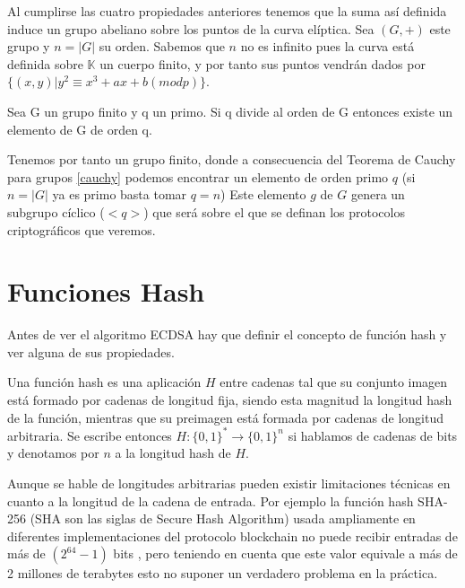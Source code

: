 Al cumplirse las cuatro propiedades anteriores tenemos que la suma así definida induce un grupo abeliano sobre los puntos de la curva elíptica. Sea $(G,+)$ este grupo y $n=|G|$ su orden. Sabemos que $n$ no es infinito pues la curva está definida sobre $\mathbb{K}$ un cuerpo finito, y por tanto sus puntos vendrán dados por $\{(x,y)| y^2 \equiv x^3 + ax + b  (mod  p) \}$. 
\theoremstyle{theorem}\begin{theorem}\label{cauchy} Sea G un grupo finito y q un primo. Si q divide al orden de G entonces existe un elemento de G de orden q.
\end{theorem}
Tenemos por tanto un grupo finito, donde a consecuencia del Teorema de Cauchy para grupos \ref{cauchy} podemos encontrar un elemento de orden primo $q$ (si $n = |G|$ ya es primo basta tomar $q = n$) Este elemento $g$ de $G$ genera un subgrupo cíclico ($<q>$) que será sobre el que se definan los protocolos criptográficos que veremos.



\section{Funciones Hash}\label{hash}
Antes de ver el algoritmo ECDSA hay que definir el concepto de función hash y ver alguna de sus propiedades.
\theoremstyle{definition}\begin{definition}\label{hash_def} Una función hash es una aplicación $\textit{H}$ entre cadenas tal que su conjunto imagen está formado por cadenas de longitud fija, siendo esta magnitud la longitud hash de la función, mientras que su preimagen está formada por cadenas de longitud arbitraria. Se escribe entonces $\textit{H}: \{0,1\}^* \rightarrow \{0,1\}^n$ si hablamos de cadenas de bits y denotamos por $n$ a la longitud hash de $\textit{H}$.\end{definition}

Aunque se hable de longitudes arbitrarias pueden existir limitaciones técnicas en cuanto a la longitud de la cadena de entrada. Por ejemplo la función hash SHA-256 (SHA son las siglas de Secure Hash Algorithm) usada ampliamente en diferentes implementaciones del protocolo blockchain no puede recibir entradas de más de $(2^{64} -1)$ bits \citep{sha256}, pero teniendo en cuenta que este valor equivale a más de 2 millones de terabytes esto no suponer un verdadero problema en la práctica.

